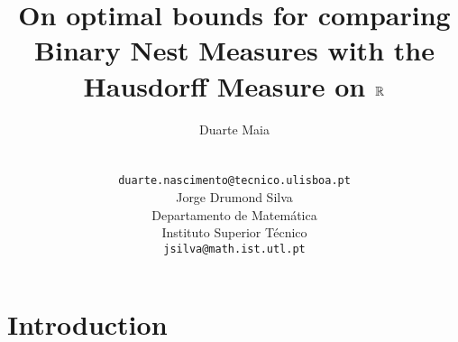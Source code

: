 \documentclass[11pt]{article}
\title{\textbf{On optimal bounds for comparing Binary Nest Measures with the Hausdorff Measure on $\mathbb{R}$}}
\author{
  Duarte Maia \\
  \\
  \\
  \texttt{duarte.nascimento@tecnico.ulisboa.pt} \\
   \And
 Jorge Drumond Silva \\
  Departamento de Matemática\\
  Instituto Superior Técnico\\
  \texttt{jsilva@math.ist.utl.pt} \\
}
\date{}
\begin{document}
\maketitle


\begin{abstract}
\lipsum[1]
\end{abstract}


\section{Introduction}




\begin{thebibliography}{1}


\end{thebibliography}
\end{document}
